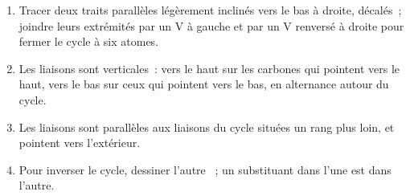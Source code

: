 \begin{method}\label{met:b1:stereochemistry-in-depth:draw-chair}
\begin{enumerate}
  \item Tracer deux traits parallèles légèrement inclinés vers le bas à
        droite, décalés~; joindre leurs extrémités par un V à gauche et
        par un V renversé à droite pour fermer le cycle à six atomes.
  \item Les liaisons  sont verticales~: vers le haut sur les
        carbones qui pointent vers le haut, vers le bas sur ceux qui
        pointent vers le bas, en alternance autour du cycle.
  \item Les liaisons  sont parallèles aux liaisons du cycle
        situées un rang plus loin, et pointent vers l'extérieur.
  \item Pour inverser le cycle, dessiner l'autre ~; un substituant
         dans l'une est  dans l'autre.
\end{enumerate}
\end{method}

